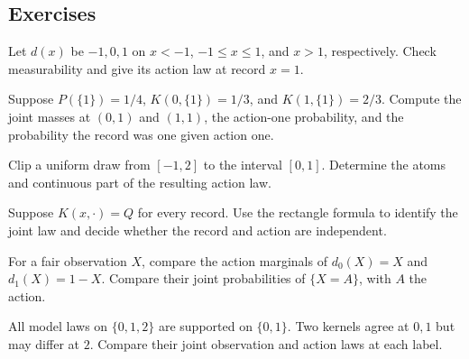 \documentclass[11pt,oneside]{book}
\theoremstyle{definition}
\theoremstyle{remark}
\begin{document}
\subsection{Exercises}
\label{subsec:worked-examples-2-1}

\begin{practiceexercise}
\label{wex:three-level-rule}
Let $d(x)$ be $-1,0,1$ on $x<-1$, $-1\le x\le1$, and $x>1$, respectively.
Check measurability and give its action law at record $x=1$.
\end{practiceexercise}

\begin{practiceexercise}
\label{wex:finite-kernel-joint}
Suppose $P(\{1\})=1/4$, $K(0,\{1\})=1/3$, and $K(1,\{1\})=2/3$. Compute the
joint masses at $(0,1)$ and $(1,1)$, the action-one probability, and the
probability the record was one given action one.
\end{practiceexercise}

\begin{practiceexercise}
\label{wex:clipping-action-marginal}
Clip a uniform draw from $[-1,2]$ to the interval $[0,1]$.
Determine the atoms and continuous part of the resulting action law.
\end{practiceexercise}

\begin{practiceexercise}
\label{wex:constant-kernel-independence}
Suppose $K(x,\cdot)=Q$ for every record. Use the rectangle formula to
identify the joint law and decide whether the record and action are
independent.
\end{practiceexercise}

\begin{practiceexercise}
\label{wex:opposite-rules-fair-bit}
For a fair observation $X$, compare the action marginals of $d_0(X)=X$ and
$d_1(X)=1-X$. Compare their joint probabilities of $\{X=A\}$, with $A$ the
action.
\end{practiceexercise}

\begin{practiceexercise}
\label{wex:kernel-null-record}
All model laws on $\{0,1,2\}$ are supported on $\{0,1\}$. Two kernels agree
at $0,1$ but may differ at $2$. Compare their joint observation and action
laws at each label.
\end{practiceexercise}
\end{document}
